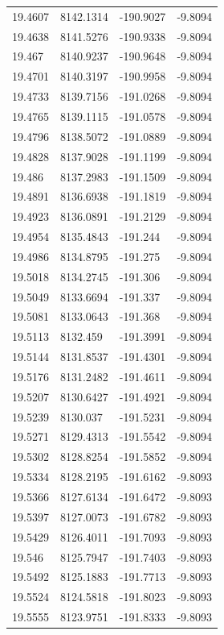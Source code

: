 \begin{table}[H]
\begin{tabular}{llll}
19.4607 & 8142.1314 & -190.9027 & -9.8094 \\
19.4638 & 8141.5276 & -190.9338 & -9.8094 \\
19.467 & 8140.9237 & -190.9648 & -9.8094 \\
19.4701 & 8140.3197 & -190.9958 & -9.8094 \\
19.4733 & 8139.7156 & -191.0268 & -9.8094 \\
19.4765 & 8139.1115 & -191.0578 & -9.8094 \\
19.4796 & 8138.5072 & -191.0889 & -9.8094 \\
19.4828 & 8137.9028 & -191.1199 & -9.8094 \\
19.486 & 8137.2983 & -191.1509 & -9.8094 \\
19.4891 & 8136.6938 & -191.1819 & -9.8094 \\
19.4923 & 8136.0891 & -191.2129 & -9.8094 \\
19.4954 & 8135.4843 & -191.244 & -9.8094 \\
19.4986 & 8134.8795 & -191.275 & -9.8094 \\
19.5018 & 8134.2745 & -191.306 & -9.8094 \\
19.5049 & 8133.6694 & -191.337 & -9.8094 \\
19.5081 & 8133.0643 & -191.368 & -9.8094 \\
19.5113 & 8132.459 & -191.3991 & -9.8094 \\
19.5144 & 8131.8537 & -191.4301 & -9.8094 \\
19.5176 & 8131.2482 & -191.4611 & -9.8094 \\
19.5207 & 8130.6427 & -191.4921 & -9.8094 \\
19.5239 & 8130.037 & -191.5231 & -9.8094 \\
19.5271 & 8129.4313 & -191.5542 & -9.8094 \\
19.5302 & 8128.8254 & -191.5852 & -9.8094 \\
19.5334 & 8128.2195 & -191.6162 & -9.8093 \\
19.5366 & 8127.6134 & -191.6472 & -9.8093 \\
19.5397 & 8127.0073 & -191.6782 & -9.8093 \\
19.5429 & 8126.4011 & -191.7093 & -9.8093 \\
19.546 & 8125.7947 & -191.7403 & -9.8093 \\
19.5492 & 8125.1883 & -191.7713 & -9.8093 \\
19.5524 & 8124.5818 & -191.8023 & -9.8093 \\
19.5555 & 8123.9751 & -191.8333 & -9.8093 \\

\end{tabular}
\end{table}
